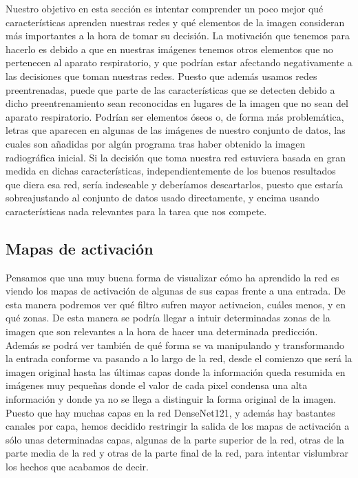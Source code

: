 \documentclass[11pt,a4paper]{article}
\theoremstyle{definition}
\begin{document}
Nuestro objetivo en esta sección es intentar comprender un poco mejor qué características aprenden nuestras redes y qué elementos de la imagen consideran más importantes a la hora de tomar su decisión.  La motivación que tenemos para hacerlo es debido a que en nuestras imágenes tenemos otros elementos que no pertenecen al aparato respiratorio, y que podrían estar afectando negativamente a las decisiones que toman nuestras redes. Puesto que además usamos redes preentrenadas, puede que parte de las características que se detecten debido a dicho preentrenamiento sean reconocidas en lugares de la imagen que no sean del aparato respiratorio. Podrían ser elementos óseos o, de forma más problemática, letras que aparecen en algunas de las imágenes de nuestro conjunto de datos, las cuales son añadidas por algún programa tras haber obtenido la imagen radiográfica inicial.  Si la decisión que toma nuestra red estuviera basada en gran medida en dichas características, independientemente de los buenos resultados que diera esa red, sería indeseable y deberíamos descartarlos, puesto que estaría sobreajustando al conjunto de datos usado directamente, y encima usando características nada relevantes para la tarea que nos compete.


\subsection{Mapas de activación}

Pensamos que una muy buena forma de visualizar cómo ha aprendido la red es viendo los mapas de activación de algunas de sus capas frente a una entrada. De esta manera podremos ver qué filtro sufren mayor activacion, cuáles menos, y en qué zonas. De esta manera se podría llegar a intuir determinadas zonas de la imagen que son relevantes a la hora de hacer una determinada predicción.  Además se podrá ver también de qué forma se va manipulando y transformando la entrada conforme va pasando a lo largo de la red, desde el comienzo que será la imagen original hasta las últimas capas donde la información queda resumida en imágenes muy pequeñas donde el valor de cada pixel condensa una alta información y donde ya no se llega a distinguir la forma original de la imagen.\\

Puesto que hay muchas capas en la red DenseNet121, y además hay bastantes canales por capa, hemos decidido restringir la salida de los mapas de activación a sólo unas determinadas capas, algunas de la parte superior de la red, otras de la parte media de la red y otras de la parte final de la red,  para intentar vislumbrar los hechos que acabamos de decir.\\
\end{document}

